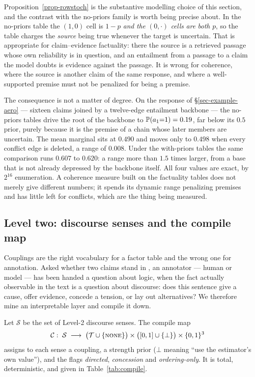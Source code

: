 Proposition~\ref{prop-rowstoch} is the substantive modelling choice of this section, and the
contrast with the no-priors family is worth being precise about. In the no-priors \ent{} table the
$(1,0)$ cell is $1-p$ \emph{and the $(0,\cdot)$ cells are both $p$}, so the table charges the
\emph{source} being true whenever the target is uncertain. That is appropriate for
claim--evidence factuality: there the source is a retrieved passage whose own reliability is in
question, and an entailment from a passage to a claim the model doubts is evidence against the
passage. It is wrong for coherence, where the source is another claim of the same response, and
where a well-supported premise must not be penalized for being a premise.

The consequence is not a matter of degree. On the response of \S\ref{sec-example-aero} --- sixteen
claims joined by a twelve-edge entailment backbone --- the no-priors tables drive the root of the
backbone to $\mathbb{P}\!\left( a_1{=}1 \right)=0.19$, far below its $0.5$ prior, purely because it is the premise of a
chain whose later members are uncertain. The mean marginal sits at $0.490$ and moves only to
$0.498$ when every conflict edge is deleted, a range of $0.008$. Under the with-priors tables the
same comparison runs $0.607$ to $0.620$: a range more than $1.5$ times larger, from a base that is
not already depressed by the backbone itself. All four values are exact, by $2^{16}$ enumeration. A
coherence measure built on the factuality tables does not merely give different numbers; it spends
its dynamic range penalizing premises and has little left for conflicts, which are the thing being
measured.

\subsection{Level two: discourse senses and the compile map}
\label{sec-level2}

Couplings are the right vocabulary for a factor table and the wrong one for annotation. Asked
whether two claims stand in \ent{}, an annotator --- human or model --- has been handed a question
about logic, when the fact actually observable in the text is a question about discourse: does this
sentence give a cause, offer evidence, concede a tension, or lay out alternatives? We therefore
mine an interpretable layer and compile it down.

\begin{definition}
\label{def-compile}
Let $\mathcal{S}$ be the set of Level-2 discourse senses. The compile map
\[
\mathcal{C}:\;\mathcal{S}\;\longrightarrow\;
  \bigl(\mathcal{T}\cup\{\textsc{none}\}\bigr)\times\bigl([0,1]\cup\{\bot\}\bigr)\times\{0,1\}^3
\]
assigns to each sense a coupling, a strength prior ($\bot$ meaning ``use the estimator's own
value''), and the flags \emph{directed}, \emph{concession} and \emph{ordering-only}. It is total,
deterministic, and given in Table~\ref{tab:compile}.
\end{definition}

